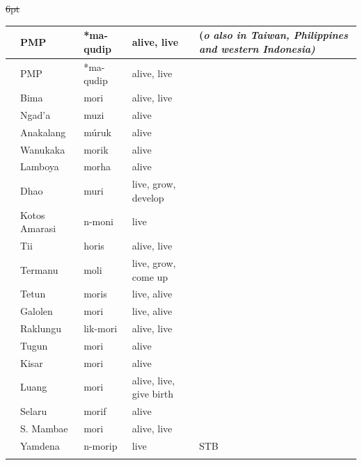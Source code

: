\newpage
{\st{6pt}\begin{xltabular}[l]{\linewidth}
{>{\hspace{-\tabcolsep}}l<{\hspace{-\tabcolsep}}
>{\hspace{-\tabcolsep}\enspace}lll
>{\raggedright\arraybackslash}X}
\lsptoprule
{}	&	PMP	&	*ma-qudip{\footnotemark}  	&	alive, live 	&	(\it{o} also in Taiwan, Philippines and western Indonesia)		\\	\midrule
\endfirsthead
\lsptoprule
	&	PMP	&	*ma-qudip  	&	alive, live 	&\\	\midrule
\endhead
\rcl	&	Bima	&	mori	&	alive, live	&		\\
	&	Ngad'a	&	muzi	&	alive	&		\\
	&	Anakalang	&	múruk	&	alive	&		\\
\rcl	&	Wanukaka	&	morik	&	alive	&		\\
\rcl	&	Lamboya	&	morha	&	alive	&		\\
	&	Dhao	&	muri	&	live, grow, develop	&		\\
\rcl	& Kotos	Amarasi	&	n-moni	&	live	&		\\
\rcl	&	Tii	&	horis	&	alive, live	&		\\
\rcl	&	Termanu	&	moli	&	live, grow, come up	&		\\
\rcl	&	Tetun	&	moris	&	live, alive	&		\\
\rcl	&	Galolen	&	mori	&	live, alive	&		\\
\rcl	&	Raklungu	&	lik-mori	&	alive, live	&		\\
\rcl	&	Tugun	&	mori	&	alive	&		\\
\rcl	&	Kisar	&	mori	&	alive	&		\\
\rcl	&	Luang	&	mori	&	alive, live, give birth	&		\\
\rcl	&	Selaru	&	morif	&	alive	&		\\
\rcl	&	S. Mambae	&	mori	&	alive, live	&		\\
\rcl	&	Yamdena	&	n-morip	&	live	&	STB	\\
\lspbottomrule
\end{xltabular}\addtocounter{table}{-1}}

